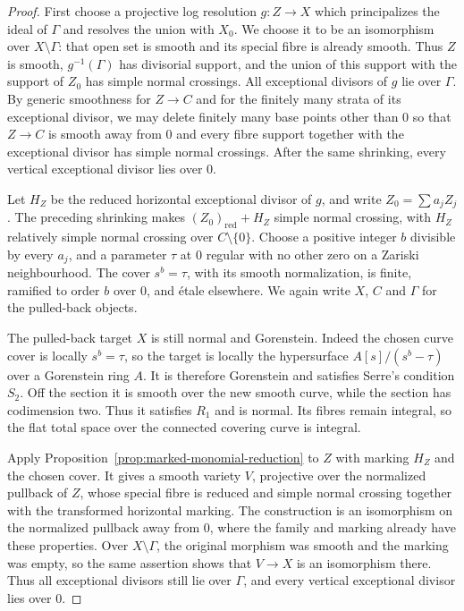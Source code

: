 \begin{proof}
First choose a projective log resolution $g:Z\to X$ which principalizes the
ideal of $\Gamma$ and resolves the union with $X_0$.  We choose it to be an
isomorphism over $X\setminus\Gamma$: that open set is smooth and its special
fibre is already smooth.  Thus $Z$ is smooth, $g^{-1}(\Gamma)$ has divisorial
support, and the union of this support with the support of $Z_0$ has simple
normal crossings.  All exceptional divisors of $g$ lie over $\Gamma$.
By generic smoothness for $Z\to C$ and for the finitely many strata of its
exceptional divisor, we may delete finitely many base points other than $0$
so that $Z\to C$ is smooth away from $0$ and every fibre support together with
the exceptional divisor has simple normal crossings.  After the same
shrinking, every vertical exceptional divisor lies over $0$.

Let $H_Z$ be the reduced horizontal exceptional divisor of $g$, and write
$Z_0=\sum a_jZ_j$.  The preceding shrinking makes
$(Z_0)_{\mathrm{red}}+H_Z$ simple normal crossing, with $H_Z$ relatively
simple normal crossing over $C\setminus\{0\}$.  Choose a positive integer
$b$ divisible by every $a_j$, and a parameter $\tau$ at $0$ regular with no
other zero on a Zariski neighbourhood.  The cover $s^b=\tau$, with its smooth
normalization, is finite, ramified to order $b$ over $0$, and \'etale
elsewhere.  We again write $X$, $C$ and $\Gamma$ for the pulled-back objects.

The pulled-back target $X$ is still normal and Gorenstein.  Indeed the chosen
curve cover is locally $s^b=\tau$, so the target is locally the hypersurface
$A[s]/(s^b-\tau)$ over a Gorenstein ring $A$.  It is therefore Gorenstein and
satisfies Serre's condition $S_2$.  Off the section it is smooth over the new
smooth curve, while the section has codimension two.  Thus it satisfies
$R_1$ and is normal.  Its fibres remain integral, so the flat total space over
the connected covering curve is integral.

Apply Proposition~\ref{prop:marked-monomial-reduction} to $Z$ with marking
$H_Z$ and the chosen cover.  It gives a smooth variety $V$, projective over
the normalized pullback of $Z$, whose special fibre is reduced and simple
normal crossing together with the transformed horizontal marking.
The construction is an isomorphism on the normalized pullback away from $0$,
where the family and marking already have these properties.  Over
$X\setminus\Gamma$, the original morphism was smooth and the marking was
empty, so the same assertion shows that $V\to X$ is an isomorphism there.
Thus all exceptional divisors still lie over $\Gamma$, and every
vertical exceptional divisor lies over $0$.


\end{proof}

